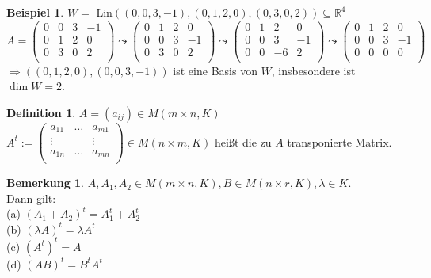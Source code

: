 \documentclass[10pt,a4paper,numbers=endperiod]{scrartcl}
\theoremstyle{definition}
\newtheorem{defi}[satz]{Definition}
\newtheorem{bem}[satz]{Bemerkung}
\newtheorem{bsp}[satz]{Beispiel}
\def\RR{{\mathbb R}}
\begin{document}
\begin{bsp}
	$W= \text{ Lin}((0,0,3,-1),(0,1,2,0),(0,3,0,2))\subseteq \RR^4$\\
	
	$A= \begin{pmatrix}
	0&0&3&-1\\
	0&1&2&0\\
	0&3&0&2\\
	\end{pmatrix}
	\leadsto
	\begin{pmatrix}
	0&1&2&0\\
	0&0&3&-1\\
	0&3&0&2\\
	\end{pmatrix}
	\leadsto
	\begin{pmatrix}
	0&1&2&0\\
	0&0&3&-1\\
	0&0&-6&2\\
	\end{pmatrix}
	\leadsto
	\begin{pmatrix}
	0&1&2&0\\
	0&0&3&-1\\
	0&0&0&0\\
	\end{pmatrix}$\\
	
	$\Rightarrow ((0,1,2,0),(0,0,3,-1))$ ist eine Basis von $W$, insbesondere ist $\dim W = 2$.
\end{bsp}

\begin{defi}
	$A = (a_{ij}) \in M(m\times n,K)$\\
	$A^t := \begin{pmatrix}
	a_{11} & \dots & a_{m1}\\
	\vdots & &\vdots\\
	a_{1n}& \dots & a_{mn}\\
	\end{pmatrix} \in M(n \times m,K)$ heißt die zu $A$ transponierte Matrix.
\end{defi}

\begin{bem}
	$A,A_1,A_2 \in M(m\times n,K), B \in M(n \times r, K), \lambda \in K.$\\
	Dann gilt:\\
	(a) $(A_1+A_2)^t = A_1^t+A_2^t$\\
	(b) $(\lambda A)^t = \lambda A^t$\\
	(c) $(A^t)^t=A$\\
	(d) $(AB)^t=B^tA^t$
\end{bem}
\end{document}
